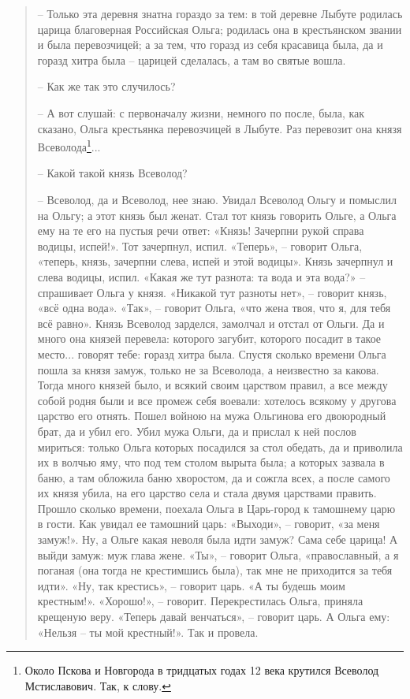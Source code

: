 \begin{quotation}
 – Только эта деревня знатна гораздо за тем: в той деревне Лыбуте родилась царица благоверная Российская Ольга; родилась она в крестьянском звании и была перевозчицей; а за тем, что горазд из себя красавица была, да и горазд хитра была – царицей сделалась, а там во святые вошла.

 – Как же так это случилось?

 – А вот слушай: с первоначалу жизни, немного по после, была, как сказано, Ольга крестьянка перевозчицей в Лыбуте. Раз перевозит она князя Всеволода\footnote{Около Пскова и Новгорода в тридцатых годах 12 века крутился Всеволод Мстиславович. Так, к слову.}...

 – Какой такой князь Всеволод?

 – Всеволод, да и Всеволод, нее знаю. Увидал Всеволод Ольгу и помыслил на Ольгу; а этот князь был женат. Стал тот князь говорить Ольге, а Ольга ему на те его на пустыя речи ответ: «Князь! Зачерпни рукой справа водицы, испей!». Тот зачерпнул, испил. «Теперь», – говорит Ольга, «теперь, князь, зачерпни слева, испей и этой водицы». Князь зачерпнул и слева водицы, испил. «Какая же тут разнота: та вода и эта вода?» – спрашивает Ольга у князя. «Никакой тут разноты нет», – говорит князь, «всё одна вода». «Так», – говорит Ольга, «что жена твоя, что я, для тебя всё равно». Князь Всеволод зарделся, замолчал и отстал от Ольги. Да и много она князей перевела: которого загубит, которого посадит в такое место... говорят тебе: горазд хитра была. Спустя сколько времени Ольга пошла за князя замуж, только не за Всеволода, а неизвестно за какова. Тогда много князей было, и всякий своим царством правил, а все между собой родня были и все промеж себя воевали: хотелось всякому у другова царство его отнять. Пошел войною на мужа Ольгинова его двоюродный брат, да и убил его. Убил мужа Ольги, да и прислал к ней послов мириться: только Ольга которых посадился за стол обедать, да и приволила их в волчью яму, что под тем столом вырыта была; а которых зазвала в баню, а там обложила баню хворостом, да и сожгла всех, а после самого их князя убила, на его царство села и стала двумя царствами править. Прошло сколько времени, поехала Ольга в Царь-город к тамошнему царю в гости. Как увидал ее тамошний царь: «Выходи», – говорит, «за меня замуж!». Ну, а Ольге какая неволя была идти замуж? Сама себе царица! А выйди замуж: муж глава жене. «Ты», – говорит Ольга, «православный, а я поганая (она тогда не крестимшись была), так мне не приходится за тебя идти». «Ну, так крестись», – говорит царь. «А ты будешь моим крестным!». «Хорошо!», – говорит. Перекрестилась Ольга, приняла крещеную веру. «Теперь давай венчаться», – говорит царь. А Ольга ему: «Нельзя – ты мой крестный!». Так и провела.
\end{quotation}

